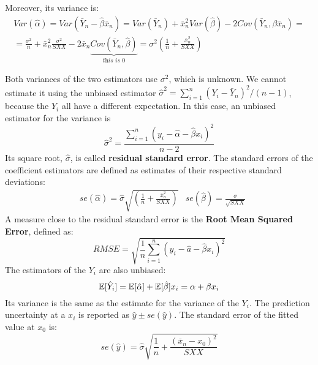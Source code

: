 Moreover, its variance is:
\begin{gather*}
    Var(\hat{\alpha}) = Var(\bar{Y}_n - \hat{\beta} \bar{x}_n) = Var(\bar{Y}_n) + \bar{x}_n^2 Var(\hat{\beta}) - 2 Cov(\bar{Y}_n, \beta \bar{x}_n) = \\
    = \frac{\sigma^2}{n} + \bar{x}_n^2 \frac{\sigma^2}{SXX} - 2 \bar{x}_n \underset{\textit{this is 0}}{\underbrace{Cov(\bar{Y}_n, \hat{\beta})}} = \sigma^2 \left( \frac{1}{n} + \frac{\bar{x}_n^2}{SXX}\right)
\end{gather*}

Both variances of the two estimators use $\sigma^2$, which is unknown. We cannot estimate it using the unbiased estimator $\hat{\sigma}^2 = \sum_{i=1}^n (Y_i - \bar{Y}_n)^2/(n-1)$, because the $Y_i$ all have a different expectation. In this case, an unbiased estimator for the variance is
\begin{equation*}
    \hat{\sigma}^2 = \frac{\sum_{i=1}^n (y_i - \hat{\alpha} - \hat{\beta} x_i)^2}{n-2}
\end{equation*}   
Its square root, $\hat{\sigma}$, is called \textbf{residual standard error}. The standard errors of the coefficient estimators are defined as estimates of their respective standard deviations:
\begin{align*}
    &se(\hat{\alpha}) = \hat{\sigma} \sqrt{\left( \frac{1}{n} + \frac{\bar{x}_n^2}{SXX} \right)} &se(\hat{\beta}) = \frac{\sigma}{\sqrt{SXX}}
\end{align*}
A measure close to the residual standard error is the \textbf{Root Mean Squared Error}, defined as:
\begin{equation*}
    RMSE = \sqrt{\frac{1}{n} \sum_{i=1}^n (y_i - \hat{a} - \hat{\beta}x_i)^2}
\end{equation*}   
The estimators of the $Y_i$ are also unbiased:
\begin{equation*}
    \mathbb{E}[\hat{Y}_i] = \mathbb{E}[\hat{\alpha}] + \mathbb{E}[\hat{\beta}] x_i = \alpha + \beta x_i
\end{equation*}   
Its variance is the same as the estimate for the variance of the $Y_i$. The prediction uncertainty at a $x_i$ is reported as $\hat{y} \pm se(\hat{y})$. The standard error of the fitted value at $x_0$ is:
\begin{equation*}
    se(\hat{y}) = \hat{\sigma} \sqrt{\frac{1}{n} + \frac{(\bar{x}_n - x_0)^2}{SXX}}
\end{equation*}

